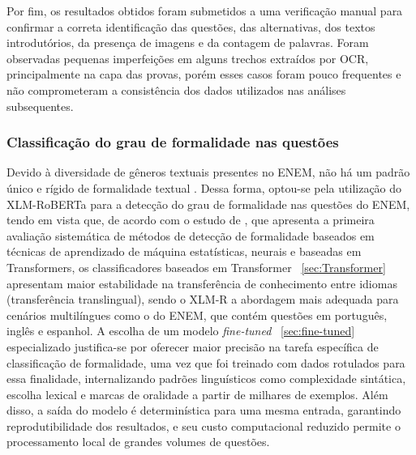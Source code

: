 \documentclass[a4paper,10pt, twocolumn]{article}
\begin{document}

Por fim, os resultados obtidos foram submetidos a uma verificação manual para confirmar a correta identificação das questões, das alternativas, dos textos introdutórios, da presença de imagens e da contagem de palavras. Foram observadas pequenas imperfeições em alguns trechos extraídos por OCR, principalmente na capa das provas, porém esses casos foram pouco frequentes e não comprometeram a consistência dos dados utilizados nas análises subsequentes.

\subsubsection{Classificação do grau de formalidade nas questões}
\label{sec:classificacao-formalidade}

Devido à diversidade de gêneros textuais presentes no ENEM, não há um padrão único e rígido de formalidade textual \cite{Ciapuscio2005,INEP_ENEM_Matriz}. Dessa forma, optou-se pela utilização do XLM-RoBERTa para a detecção do grau de formalidade nas questões do ENEM, tendo em vista que, de acordo com o estudo de \textcite{dementieva2023detecting}, que apresenta a primeira avaliação sistemática de métodos de detecção de formalidade baseados em técnicas de aprendizado de máquina estatísticas, neurais e baseadas em Transformers, os classificadores baseados em Transformer ~\ref{sec:Transformer}  apresentam maior estabilidade na transferência de conhecimento entre idiomas (transferência translingual), sendo o XLM-R a abordagem mais adequada para cenários multilíngues como o do ENEM, que contém questões em português, inglês e espanhol.
A escolha de um modelo \textit{fine-tuned}
 ~\ref{sec:fine-tuned} especializado justifica-se por oferecer maior precisão na tarefa específica de classificação de formalidade, uma vez que foi treinado com dados rotulados para essa finalidade, internalizando padrões linguísticos como complexidade sintática, escolha lexical e marcas de oralidade a partir de milhares de exemplos. Além disso, a saída do modelo é determinística para uma mesma entrada, garantindo reprodutibilidade dos resultados, e seu custo computacional reduzido permite o processamento local de grandes volumes de questões.
\end{document}
